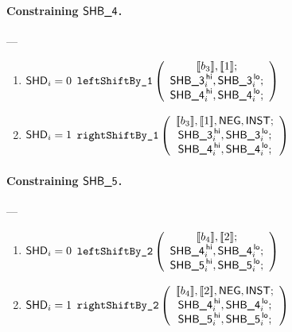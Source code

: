 \paragraph{Constraining $\textsf{SHB\_4}$.} ---
\begin{enumerate}
	\item \If $\textsf{SHD}_{i} = 0$ \Then $\texttt{leftShiftBy\_1}
		\left( \begin{array}{c}
			[\![b_{3}]\!], [\![1]\!]; \\
			\textsf{SHB\_3}^{\mathsf{\,hi}}_{i}, \textsf{SHB\_3}^{\mathsf{\,lo}}_{i}; \\
			\textsf{SHB\_4}^{\mathsf{\,hi}}_{i}, \textsf{SHB\_4}^{\mathsf{\,lo}}_{i}; \\
		\end{array}\right)$
	\item \If $\textsf{SHD}_{i} = 1$ \Then $\texttt{rightShiftBy\_1}
		\left( \begin{array}{c}
			[\![b_{3}]\!], [\![1]\!], \textsf{NEG}, \textsf{INST}; \\
			\textsf{SHB\_3}^{\mathsf{\,hi}}_{i}, \textsf{SHB\_3}^{\mathsf{\,lo}}_{i}; \\
			\textsf{SHB\_4}^{\mathsf{\,hi}}_{i}, \textsf{SHB\_4}^{\mathsf{\,lo}}_{i}; \\
		\end{array}\right)$
\end{enumerate}

\paragraph{Constraining $\textsf{SHB\_5}$.} ---
\begin{enumerate}
	\item \If $\textsf{SHD}_{i} = 0$ \Then $\texttt{leftShiftBy\_2}
		\left( \begin{array}{c}
			[\![b_{4}]\!], [\![2]\!]; \\
			\textsf{SHB\_4}^{\mathsf{\,hi}}_{i}, \textsf{SHB\_4}^{\mathsf{\,lo}}_{i}; \\
			\textsf{SHB\_5}^{\mathsf{\,hi}}_{i}, \textsf{SHB\_5}^{\mathsf{\,lo}}_{i}; \\
		\end{array}\right)$
	\item \If $\textsf{SHD}_{i} = 1$ \Then $\texttt{rightShiftBy\_2}
		\left( \begin{array}{c}
			[\![b_{4}]\!], [\![2]\!], \textsf{NEG}, \textsf{INST}; \\
			\textsf{SHB\_4}^{\mathsf{\,hi}}_{i}, \textsf{SHB\_4}^{\mathsf{\,lo}}_{i}; \\
			\textsf{SHB\_5}^{\mathsf{\,hi}}_{i}, \textsf{SHB\_5}^{\mathsf{\,lo}}_{i}; \\
		\end{array}\right)$
\end{enumerate}

